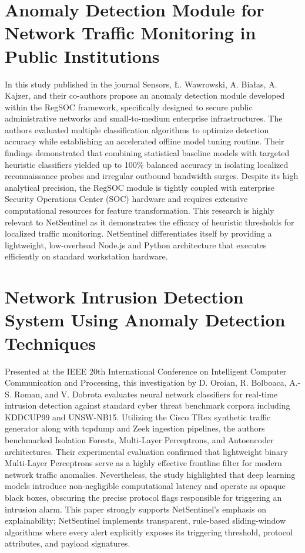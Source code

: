 \documentclass[a4paper,12pt]{report}
\begin{document}
	\section{Anomaly Detection Module for Network Traffic Monitoring in Public Institutions}
	\par
	In this study published in the journal Sensors, {\L}. Wawrowski, A. Bia{\l}as, A. Kajzer, and their co-authors propose an anomaly detection module developed within the RegSOC framework, specifically designed to secure public administrative networks and small-to-medium enterprise infrastructures. The authors evaluated multiple classification algorithms to optimize detection accuracy while establishing an accelerated offline model tuning routine. Their findings demonstrated that combining statistical baseline models with targeted heuristic classifiers yielded up to 100\% balanced accuracy in isolating localized reconnaissance probes and irregular outbound bandwidth surges. Despite its high analytical precision, the RegSOC module is tightly coupled with enterprise Security Operations Center (SOC) hardware and requires extensive computational resources for feature transformation. This research is highly relevant to NetSentinel as it demonstrates the efficacy of heuristic thresholds for localized traffic monitoring. NetSentinel differentiates itself by providing a lightweight, low-overhead Node.js and Python architecture that executes efficiently on standard workstation hardware.~\cite{two}
	
	\section{Network Intrusion Detection System Using Anomaly Detection Techniques}
	\par
	Presented at the IEEE 20th International Conference on Intelligent Computer Communication and Processing, this investigation by D. Oroian, R. Bolboaca, A.-S. Roman, and V. Dobrota evaluates neural network classifiers for real-time intrusion detection against standard cyber threat benchmark corpora including KDDCUP99 and UNSW-NB15. Utilizing the Cisco TRex synthetic traffic generator along with tcpdump and Zeek ingestion pipelines, the authors benchmarked Isolation Forests, Multi-Layer Perceptrons, and Autoencoder architectures. Their experimental evaluation confirmed that lightweight binary Multi-Layer Perceptrons serve as a highly effective frontline filter for modern network traffic anomalies. Nevertheless, the study highlighted that deep learning models introduce non-negligible computational latency and operate as opaque black boxes, obscuring the precise protocol flags responsible for triggering an intrusion alarm. This paper strongly supports NetSentinel's emphasis on explainability; NetSentinel implements transparent, rule-based sliding-window algorithms where every alert explicitly exposes its triggering threshold, protocol attributes, and payload signatures.~\cite{three}
	
\end{document}
